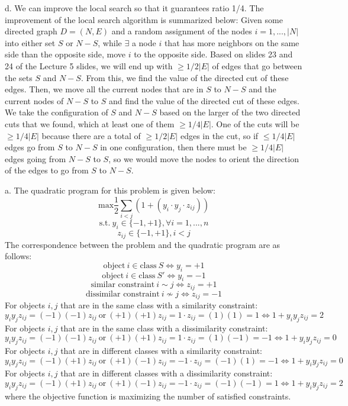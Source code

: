 \documentclass[oneside]{homework} %
\begin{document}
\newline
\newline
{\large d.} We can improve the local search so that it guarantees ratio 1/4. The improvement of the local search algorithm is summarized below:
\newline
\newline
Given some directed graph $D = (N,E)$ and a random assignment of the nodes $i = 1,...,|N|$ into either set $S$ or $N-S$, while $\exists$ a node $i$ that has more neighbors on the same side than the opposite side, move $i$ to the opposite side. Based on slides 23 and 24 of the Lecture 5 slides, we will end up with $\geq 1/2|E|$ of edges that go between the sets $S$ and $N-S$. From this, we find the value of the directed cut of these edges. Then, we move all the current nodes that are in $S$ to $N-S$ and the current nodes of $N-S$ to $S$ and find the value of the directed cut of these edges. We take the configuration of $S$ and $N-S$ based on the larger of the two directed cuts that we found, which at least one of them $\geq 1/4|E|$. One of the cuts will be $\geq 1/4|E|$ because there are a total of $\geq 1/2|E|$ edges in the cut, so if $\leq 1/4|E|$ edges go from $S$ to $N-S$ in one configuration, then there must be $\geq 1/4|E|$ edges going from $N-S$ to $S$, so we would move the nodes to orient the direction of the edges to go from $S$ to $N-S$.

{\large a.} The quadratic program for this problem is given below:
$$\text{max}\frac{1}{2}\sum\limits_{i<j}(1 +(y_i \cdot y_j \cdot z_{ij}))$$
$$\text{s.t.} \ y_i \in \{-1, +1\}, \forall i = 1,...,n$$
$$z_{ij} \in \{-1, +1\}, i < j$$
The correspondence between the problem and the quadratic program are as follows:
$$\text{object} \ i \in \text{class} \ S \Leftrightarrow y_i = +1$$
$$\text{object} \ i \in \text{class} \ S' \Leftrightarrow y_i = -1$$
$$\text{similar constraint} \ i \sim j \Leftrightarrow z_{ij} = +1$$
$$\text{dissimilar constraint} \ i \nsim j \Leftrightarrow z_{ij} = -1$$ 
\newline
For objects $i, j$ that are in the same class with a similarity constraint: $$y_i y_j z_{ij} = (-1)(-1)z_{ij} \ \text{or} \ (+1)(+1)z_{ij} = 1 \cdot z_{ij} = (1)(1) = 1 \Leftrightarrow 1 + y_i y_j z_{ij} = 2$$
For objects $i, j$ that are in the same class with a dissimilarity constraint: $$y_i y_j z_{ij} = (-1)(-1)z_{ij} \ \text{or} \ (+1)(+1)z_{ij} = 1 \cdot z_{ij} = (1)(-1) = -1 \Leftrightarrow 1 + y_i y_j z_{ij} = 0$$
For objects $i, j$ that are in different classes with a similarity constraint: $$y_i y_j z_{ij} = (-1)(+1)z_{ij} \ \text{or} \ (+1)(-1)z_{ij} = -1 \cdot z_{ij} = (-1)(1) = -1 \Leftrightarrow 1 + y_i y_j z_{ij} = 0$$
For objects $i, j$ that are in different classes with a dissimilarity constraint: $$y_i y_j z_{ij} = (-1)(+1)z_{ij} \ \text{or} \ (+1)(-1)z_{ij} = -1 \cdot z_{ij} = (-1)(-1) = 1 \Leftrightarrow 1 + y_i y_j z_{ij} = 2$$
where the objective function is maximizing the number of satisfied constraints.
\end{document}
